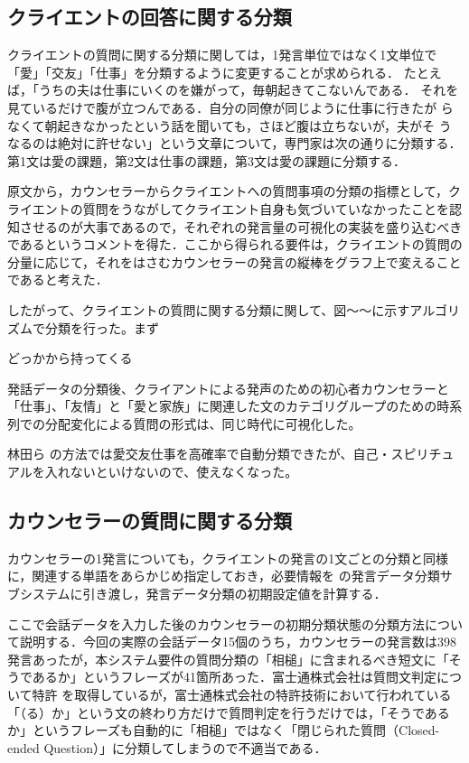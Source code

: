 \documentclass[shuuron]{kuee}
\begin{document}
\subsection{クライエントの回答に関する分類} %



クライエントの質問に関する分類に関しては，1発言単位ではなく1文単位で「愛」「交友」「仕事」を分類するように変更することが求められる．
たとえば，「うちの夫は仕事にいくのを嫌がって，毎朝起きてこないんである．
それを見ているだけで腹が立つんである．自分の同僚が同じように仕事に行きたが
らなくて朝起きなかったという話を聞いても，さほど腹は立ちないが，夫がそ
うなるのは絶対に許せない」という文章について，専門家は次の通りに分類する．第1文は愛の課題，第2文は仕事の課題，第3文は愛の課題に分類する．

原文から，カウンセラーからクライエントへの質問事項の分類の指標として，クライエントの質問をうながしてクライエント自身も気づいていなかったことを認知させるのが大事であるので，それぞれの発言量の可視化の実装を盛り込むべきであるというコメントを得た．ここから得られる要件は，クライエントの質問の分量に応じて，それをはさむカウンセラーの発言の縦棒をグラフ上で変えることであると考えた．

したがって、クライエントの質問に関する分類に関して、図〜〜に示すアルゴリズムで分類を行った。まず

どっかから持ってくる

発話データの分類後、クライアントによる発声のための初心者カウンセラーと「仕事」、「友情」と「愛と家族」に関連した文のカテゴリグループのための時系列での分配変化による質問の形式は、同じ時代に可視化した。

  林田ら\cite{hayashidaJp} \cite{hayashidaEn}の方法では愛交友仕事を高確率で自動分類できたが、自己・スピリチュアルを入れないといけないので、使えなくなった。

\subsection{カウンセラーの質問に関する分類} %

カウンセラーの1発言についても，クライエントの発言の1文ごとの分類と同様に，関連する単語をあらかじめ指定しておき，必要情報を
の発言データ分類サブシステムに引き渡し，発言データ分類の初期設定値を計算する．

ここで会話データを入力した後のカウンセラーの初期分類状態の分類方法について説明する．今回の実際の会話データ15個のうち，カウンセラーの発言数は398発言あったが，本システム要件の質問分類の「相槌」に含まれるべき短文に「そうであるか」というフレーズが41箇所あった．富士通株式会社は質問文判定について特許
\cite{tokkyo}
を取得しているが，富士通株式会社の特許技術において行われている「（る）か」という文の終わり方だけで質問判定を行うだけでは，「そうであるか」というフレーズも自動的に「相槌」ではなく「閉じられた質問（Closed-ended Question）」に分類してしまうので不適当である．
\end{document}

